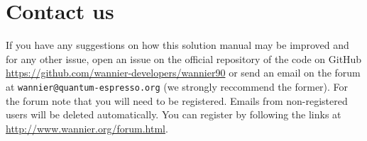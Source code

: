 \section*{Contact us}
\label{sec:contacts}

If you have any suggestions on how this solution manual may be improved and for any other issue, open an issue on the official repository of the \Wannier{} code on GitHub \url{https://github.com/wannier-developers/wannier90} or send an email on the forum at \newline \texttt{wannier@quantum-espresso.org} (we strongly reccommend the former).
For the forum note that you will need to be registered. Emails from non-registered users will be deleted automatically. You can register by following the links at
\url{http://www.wannier.org/forum.html}.
